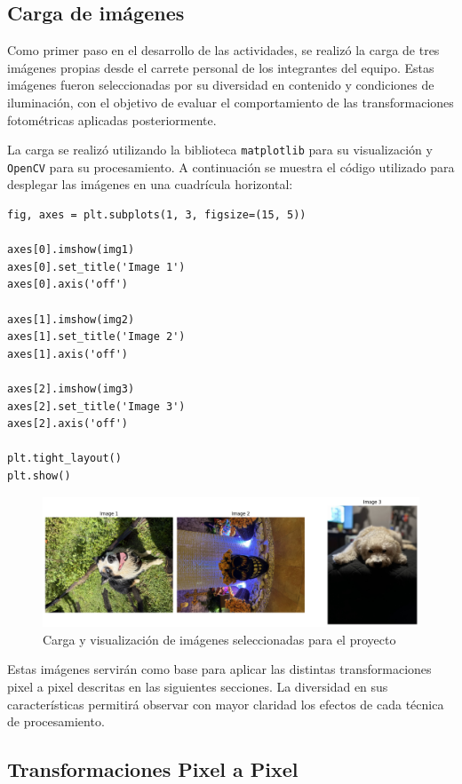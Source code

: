 \documentclass[12pt,letterpaper]{article}
\begin{document}
\subsection{Carga de imágenes}
Como primer paso en el desarrollo de las actividades, se realizó la carga de tres imágenes propias desde el carrete personal de los integrantes del equipo. Estas imágenes fueron seleccionadas por su diversidad en contenido y condiciones de iluminación, con el objetivo de evaluar el comportamiento de las transformaciones fotométricas aplicadas posteriormente.

La carga se realizó utilizando la biblioteca \texttt{matplotlib} para su visualización y \texttt{OpenCV} para su procesamiento. A continuación se muestra el código utilizado para desplegar las imágenes en una cuadrícula horizontal:

\begin{verbatim}
fig, axes = plt.subplots(1, 3, figsize=(15, 5))

axes[0].imshow(img1)
axes[0].set_title('Image 1')
axes[0].axis('off')

axes[1].imshow(img2)
axes[1].set_title('Image 2')
axes[1].axis('off')

axes[2].imshow(img3)
axes[2].set_title('Image 3')
axes[2].axis('off')

plt.tight_layout()
plt.show()
\end{verbatim}

\begin{figure}[H]
    \centering
    \includegraphics[width=0.9\linewidth]{figuras/carga_imagenes.png}
    \caption{Carga y visualización de imágenes seleccionadas para el proyecto}
    \label{fig:carga_imagenes}
\end{figure}

Estas imágenes servirán como base para aplicar las distintas transformaciones pixel a pixel descritas en las siguientes secciones. La diversidad en sus características permitirá observar con mayor claridad los efectos de cada técnica de procesamiento.

\subsection{Transformaciones Pixel a Pixel}
\end{document}
